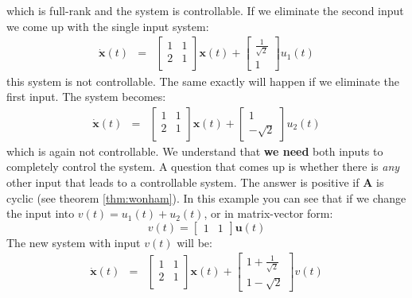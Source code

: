 \documentclass[a4paper,10pt,oneside]{book}
\begin{document}
which is full-rank and the system is controllable. If we eliminate the second input we come up with the single input system:
 \begin{eqnarray}
\dot{\mathbf{x}}(t)&=&\left[ {\begin{array}{cc}
 1 & 1  \\
 2 & 1  \\
 \end{array} } \right]
\mathbf{x}(t)+ 
\left[ {\begin{array}{c}
 \frac{1}{\sqrt{2}}\\
 1
 \end{array} } \right]
u_1(t)
\end{eqnarray}
this system is not controllable. The same exactly will happen if we eliminate the first input. The system becomes:
 \begin{eqnarray}
\dot{\mathbf{x}}(t)&=&\left[ {\begin{array}{cc}
 1 & 1  \\
 2 & 1  \\
 \end{array} } \right]
\mathbf{x}(t)+ 
\left[ {\begin{array}{c}
  1\\
 -\sqrt{2}
 \end{array} } \right]
u_2(t)
\end{eqnarray}
which is again not controllable. We understand that \textbf{we need} both inputs to completely control the system.
A question that comes up is whether there is \emph{any} other input that leads to a controllable system. The answer is
positive if $\mathbf{A}$ is cyclic (see theorem \ref{thm:wonham}). In this example you can see that if we change the input into $v(t)=u_1(t)+u_2(t)$, or in matrix-vector form:
\begin{equation}
 v(t)=\left[ {\begin{array}{cc}1&1\end{array} } \right]\mathbf{u}(t)
\end{equation}
The new system with input $v(t)$ will be:
 \begin{eqnarray}
\dot{\mathbf{x}}(t)&=&\left[ {\begin{array}{cc}
 1 & 1  \\
 2 & 1  \\
 \end{array} } \right]
\mathbf{x}(t)+ 
\left[ {\begin{array}{c}
  1+\frac{1}{\sqrt{2}}\\
 1-\sqrt{2}
 \end{array} } \right]
v(t)
\end{eqnarray}
\end{document}
